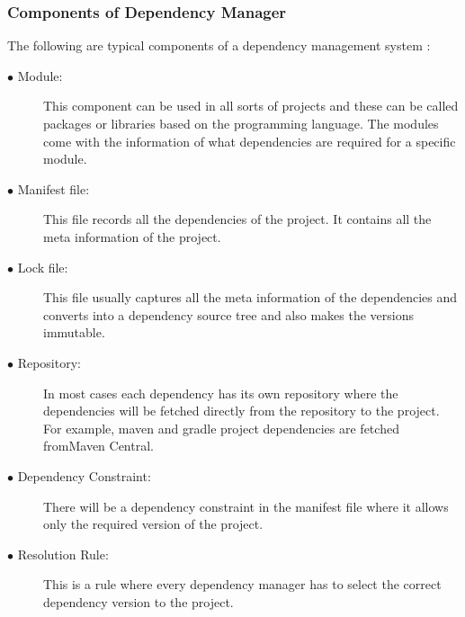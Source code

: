 \subsubsection{Components of Dependency Manager}
The following are typical components of a dependency management system \cite{DataWH}:
\begin{description}
	\item [$\bullet$ Module:] This component can be used in all sorts of projects and these can be called packages or libraries based on the programming language. The modules come with the information of what dependencies are required for a specific module.
	
	\item [$\bullet$ Manifest file:] This file records all the dependencies of the project. It contains all the meta information of the project. 
	
	\item [$\bullet$ Lock file:] This file usually captures all the meta information of the dependencies and converts into a dependency source tree and also makes the versions immutable.
	
	\item [$\bullet$ Repository:] In most cases each dependency has its own repository where the dependencies will be fetched directly from the repository to the project. For example, maven and gradle project dependencies are fetched fromMaven Central.
	
	\item [$\bullet$ Dependency Constraint:] There will be a dependency constraint in the manifest file where it allows only the required version of the project.
	
	\item [$\bullet$ Resolution Rule:] This is a rule where every dependency manager has to select the correct dependency version to the project.
	
\end{description}

%

